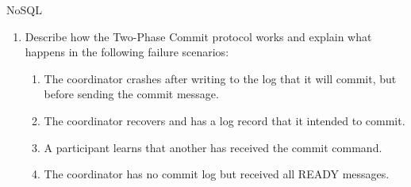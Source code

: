\documentclass{article}
\begin{document}
\begin{exercise}{NoSQL}
\begin{enumerate}
    \item Describe how the Two-Phase Commit protocol works and explain what happens in the following failure scenarios:
      \begin{enumerate}
        \item The coordinator crashes after writing to the log that it will commit, but before sending the commit message. 
        \item The coordinator recovers and has a log record that it intended to commit. 
        \item A participant learns that another has received the commit command. 
        \item The coordinator has no commit log but received all READY messages. 
      \end{enumerate}
  \end{enumerate}
\end{exercise}
\end{document}
